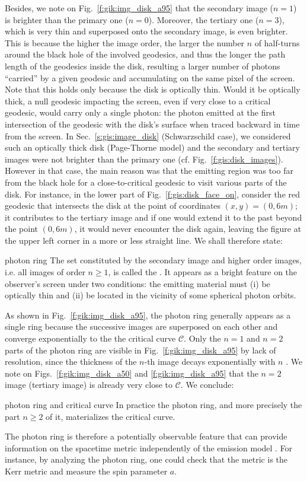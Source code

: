 Besides, we note on Fig.~\ref{f:gik:img_disk_a95}
that the secondary image ($n=1$) is brighter than the primary one ($n=0$). Moreover,
the tertiary one ($n=3$), which is very thin and superposed onto the secondary image,
is even brighter. This is because the higher the image order, the larger the
number $n$ of half-turns around the black hole of the involved geodesics,
and thus the longer the path length of the geodesics inside the disk, resulting
a larger number of photons ``carried'' by a given geodesic and accumulating on
the same pixel of the screen. Note that this holds only
because the disk is optically thin. Would it be optically thick, a null geodesic
impacting the screen, even if very close to a critical geodesic, would carry only a single photon: the photon emitted at the
first intersection of the geodesic with the disk's surface when traced backward in time from the screen.
In Sec.~\ref{s:gis:image_disk} (Schwarzschild case), we considered such an optically thick
disk (Page-Thorne model) and the secondary and tertiary images were not brighter than
the primary one (cf. Fig.~\ref{f:gis:disk_images}). However in that case, the main
reason was that the emitting region was too far from the black hole for a close-to-critical
geodesic to visit various parts of the disk. For instance, in the lower part of Fig.~\ref{f:gis:disk_face_on}, consider the red geodesic that intersects the disk
at the point of coordinates $(x,y) = (0, 6m)$; it contributes to
the tertiary image and if one would extend it to the past beyond the point $(0, 6m)$, it
would never encounter the disk again, leaving the figure at the upper left corner
in a more or less straight line. We shall therefore state:
\begin{tprop}{photon ring}{}
The set constituted by the secondary image and higher order images, i.e. all images
of order $n\geq 1$, is called
the .
It appears as a bright feature on the observer's screen under two conditions:
the emitting material must (i) be optically
thin and (ii) be located in the vicinity of some spherical photon orbits.
\end{tprop}
As shown
in Fig.~\ref{f:gik:img_disk_a95}, the photon ring generally appears as a single ring because
the successive images are superposed on each other and converge exponentially
to the the critical curve $\mathscr{C}$. Only the $n=1$ and $n=2$ parts of the photon ring
are visible in Fig.~\ref{f:gik:img_disk_a95} by lack of resolution, since
the thickness of the $n$-th image decays exponentially with $n$ \cite{GrallL20a}.
We note on Figs.~\ref{f:gik:img_disk_a50} and \ref{f:gik:img_disk_a95}
that the $n=2$ image (tertiary image) is already very close to $\mathscr{C}$.
We conclude:
\begin{tprop}{photon ring and critical curve}{}
In practice the photon ring, and more precisely the part $n\geq 2$ of it,
materializes the critical curve.
\end{tprop}
The photon ring is therefore
a potentially observable feature that can provide information on the
spacetime metric independently of the emission model \cite{Johns_al20}.
For instance, by analyzing the photon ring, one could check that the metric is the Kerr metric and measure the spin parameter $a$.

